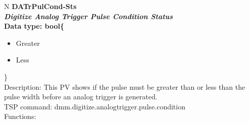 \documentclass[openany]{article}
\begin{document}
		\begin{tabular}{N}
			\hline
			\bfseries DATrPulCond-Sts\label{pv:datrpulcond-sts} \\ \hline
			\emph{Digitize Analog Trigger Pulse Condition Status} \\
			Data type: bool\{\begin{itemize}[noitemsep]
				\small
				\item[] Greater
				\item[] Less
			\end{itemize}\} \\
			Description: This PV shows if the pulse must be greater than or less than the pulse width before an analog trigger is generated. \\
			TSP command: dmm.digitize.analogtrigger.pulse.condition \\
			Functions: \\
			\arrayrulecolor{\FuncTableBorderColor}

		\end{tabular}
\end{document}
